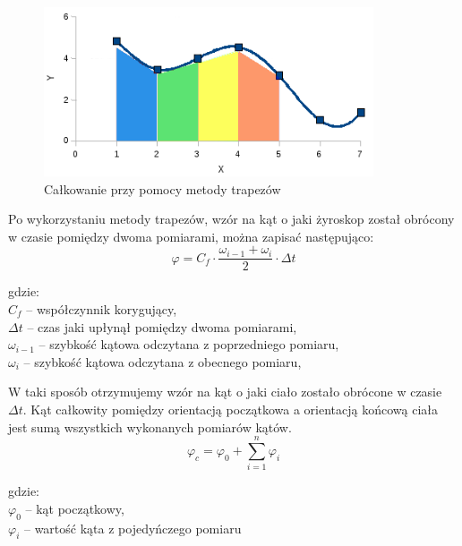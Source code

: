 \begin{figure}[h!]
 \centering
 \includegraphics[height=50mm]{../images/ch04/calkowanie-metoda-trapezow.png}
 \caption[Całkowanie przy pomocy metody trapezów]{Całkowanie przy pomocy metody trapezów\footnotemark}
 \label{fig:CalkowanieTrapezy}
\end{figure}

Po wykorzystaniu metody trapezów, wzór na kąt o jaki żyroskop został obrócony w czasie pomiędzy dwoma pomiarami, można zapisać następująco:
\begin{equation}
  \varphi = C_{f} \cdot \frac{\omega_{i-1} + \omega_{i}}{2} \cdot \Delta t
\end{equation}
\begin{tabbing}
  gdzie: \= \\
    \> $C_{f}$ -- współczynnik korygujący, \\
    \> $\Delta t$ -- czas jaki upłynął pomiędzy dwoma pomiarami,\\
    \> $\omega_{i-1}$ -- szybkość kątowa odczytana z poprzedniego pomiaru,\\
    \> $\omega_{i}$ -- szybkość kątowa odczytana z obecnego pomiaru,\\
\end{tabbing}

W taki sposób otrzymujemy wzór na kąt o jaki ciało zostało obrócone w czasie $\Delta t$. Kąt całkowity pomiędzy orientacją początkowa a orientacją końcową ciała jest sumą wszystkich wykonanych pomiarów kątów.
\begin{equation}
  \varphi_{c} = \varphi_{0} + \sum_{i=1}^{n} \varphi_{i} 
\end{equation}
\begin{tabbing}
  gdzie: \= \\
    \> $\varphi_{0}$ -- kąt początkowy,\\
    \> $\varphi_{i}$ -- wartość kąta z pojedyńczego pomiaru\\
\end{tabbing}

